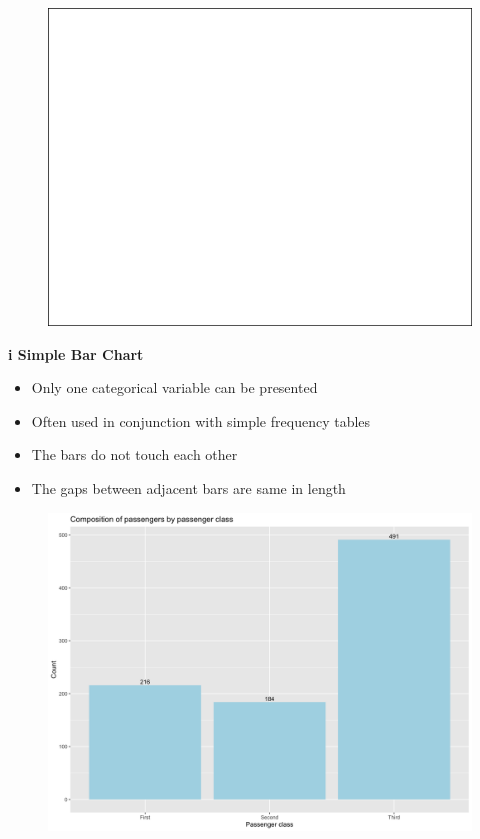 \documentclass[]{book}
\providecommand{\tightlist}{%
  \setlength{\itemsep}{0pt}\setlength{\parskip}{0pt}}
\begin{document}
\begin{figure}

{\centering \includegraphics[width=1\linewidth]{figure/box6-1} 

}

\end{figure}

\textbf{i Simple Bar Chart}

\begin{itemize}
\tightlist
\item
  Only one categorical variable can be presented
\item
  Often used in conjunction with simple frequency tables
\item
  The bars do not touch each other
\item
  The gaps between adjacent bars are same in length
\end{itemize}

\begin{figure}

{\centering \includegraphics[width=1\linewidth]{figure/box8-1} 

}

\end{figure}
\end{document}
